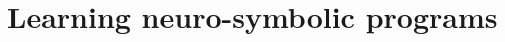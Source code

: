 \documentclass[Dual]{iitddiss}
\begin{document}



\acknowledgements

\pagebreak


\abstract

\pagebreak


\begin{singlespace}
\tableofcontents
\thispagestyle{empty}

\listoftables
{}
\listoffigures
{}
\end{singlespace}
\pagebreak


\chapter{Learning neuro-symbolic programs}
\pagebreak

\pagebreak

\pagebreak

\pagebreak

\pagebreak

\pagebreak

\pagebreak
\end{document}
